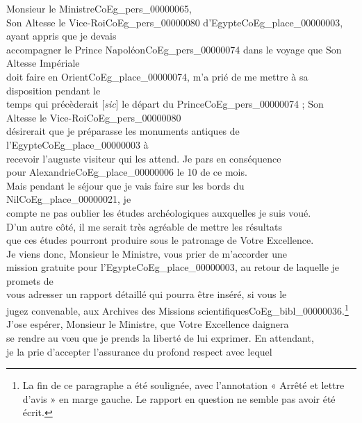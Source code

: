 \documentclass{book}
\begin{document}
{\hspace{1cm} Monsieur le Ministre\gls{CoEg_pers_00000065},\\

\indent Son Altesse le Vice-Roi\gls{CoEg_pers_00000080} d’Egypte\gls{CoEg_place_00000003}, ayant appris que je devais\\
accompagner le Prince Napoléon\gls{CoEg_pers_00000074} dans le voyage que Son Altesse Impériale\\
doit faire en Orient\gls{CoEg_place_00000074}, m’a prié de me mettre à sa disposition pendant le\\
temps qui précèderait [\textit{sic}] le départ du Prince\gls{CoEg_pers_00000074} ; Son Altesse le Vice-Roi\gls{CoEg_pers_00000080}\\
désirerait que je préparasse les monuments antiques de l’Egypte\gls{CoEg_place_00000003} à\\
recevoir l’auguste visiteur qui les attend. Je pars en conséquence\\
pour Alexandrie\gls{CoEg_place_00000006} le 10 de ce mois.\\
\indent Mais pendant le séjour que je vais faire sur les bords du Nil\gls{CoEg_place_00000021}, je\\
compte ne pas oublier les études archéologiques auxquelles je suis voué.\\
D’un autre côté, il me serait très agréable de mettre les résultats\\
que ces études pourront produire sous le patronage de Votre Excellence.\\
Je viens donc, Monsieur le Ministre, vous prier de m’accorder une\\
mission gratuite pour l'Egypte\gls{CoEg_place_00000003}, au retour de laquelle je promets de\\
vous adresser un rapport détaillé qui pourra être inséré, si vous le\\
jugez convenable, aux Archives des Missions scientifiques\gls{CoEg_bibl_00000036}.\footnote{La fin de ce paragraphe a été soulignée, avec l’annotation « Arrêté et lettre d’avis » en marge gauche. Le rapport en question ne semble pas avoir été écrit.}\\
\indent J’ose espérer, Monsieur le Ministre, que Votre Excellence daignera\\
se rendre au vœu que je prends la liberté de lui exprimer. En attendant,\\
je la prie d’accepter l’assurance du profond respect avec lequel\\
}
\end{document}
